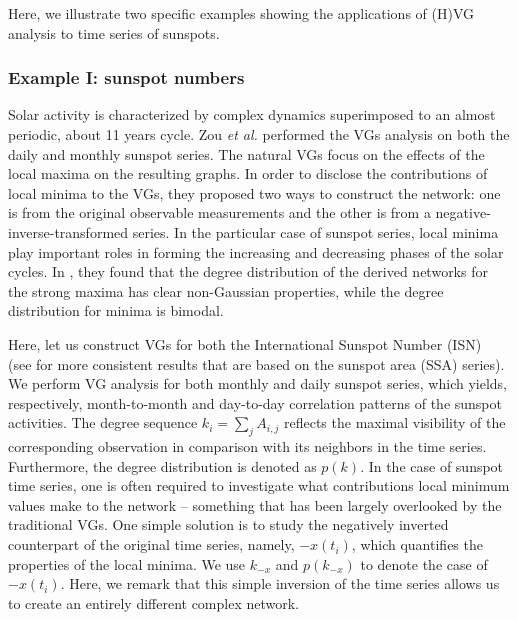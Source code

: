 	Here, we illustrate two specific examples showing the applications of (H)VG analysis to time series of sunspots. 				
		\subsubsection{Example I: sunspot numbers} \label{subsec:sunnum}
		Solar activity is characterized by complex dynamics superimposed to an almost periodic, about 11 years cycle. Zou {\textit{et al.}} \cite{Zou2014a} performed the VGs analysis on both the daily and monthly sunspot series. The natural VGs focus on the effects of the local maxima on the resulting graphs. In order to disclose the contributions of local minima to the VGs, they proposed two ways to construct the network: one is from the original observable measurements and the other is from a negative-inverse-transformed series. In the particular case of sunspot series, local minima play important roles in forming the increasing and decreasing phases of the solar cycles. In \cite{Zou2014a}, they found that the degree distribution of the derived networks for the strong maxima has clear non-Gaussian properties, while the degree distribution for minima is bimodal. 
		
		Here, let us construct VGs for both the International Sunspot Number (ISN)~\cite{sidcDataBelgium} (see \cite{Zou2014a} for more consistent results that are based on the sunspot area (SSA) series). We perform VG analysis for both monthly and daily sunspot series, which yields, respectively, month-to-month and day-to-day correlation patterns of the sunspot activities. The degree sequence $k_i = \sum_j A_{i,j}$ reflects the maximal visibility of the corresponding observation in comparison with its neighbors in the time series. Furthermore, the degree distribution is denoted as $p(k)$. In the case of sunspot time series, one is often required to investigate what contributions local minimum values make to the network -- something that has been largely overlooked by the traditional VGs. One simple solution is to study the negatively inverted counterpart of the original time series, namely, $-x(t_i)$, which quantifies the properties of the local minima. We use $k_{-x}$ and $p(k_{-x})$ to denote the case of $-x(t_i)$. Here, we remark that this simple inversion of the time series allows us to create an entirely different complex network. 
		
